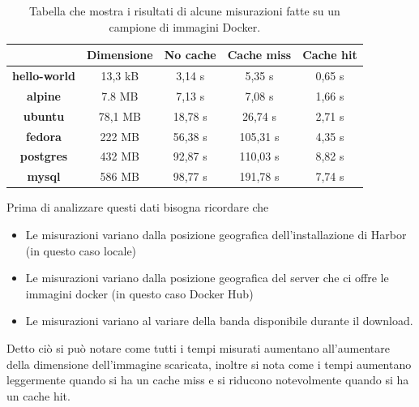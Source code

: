 \documentclass[12pt,a4paper]{report}
\begin{document}
\begin{table}[]
    \begin{tabular}{|c|c|c|c|c|}
    \hline
                         & \textbf{Dimensione} & \textbf{No cache} & \textbf{Cache miss} & \textbf{Cache hit} \\ \hline
    \textbf{hello-world} & 13,3 kB             & 3,14 s            & 5,35 s              & 0,65 s             \\ \hline
    \textbf{alpine}      & 7.8 MB              & 7,13 s            & 7,08 s              & 1,66 s             \\ \hline
    \textbf{ubuntu}      & 78,1 MB             & 18,78 s           & 26,74 s             & 2,71 s             \\ \hline
    \textbf{fedora}      & 222 MB              & 56,38 s           & 105,31 s            & 4,35 s             \\ \hline
    \textbf{postgres}    & 432 MB              & 92,87 s           & 110,03 s            & 8,82 s             \\ \hline
    \textbf{mysql}       & 586 MB              & 98,77 s           & 191,78 s            & 7,74 s             \\ \hline
    \end{tabular}
    \caption{Tabella che mostra i risultati di alcune misurazioni fatte su un campione di immagini Docker.}
    \label{table:benchmark}
\end{table}
Prima di analizzare questi dati bisogna ricordare che
\begin{itemize}
    \item Le misurazioni variano dalla posizione geografica dell'installazione di Harbor (in questo caso locale)
    \item Le misurazioni variano dalla posizione geografica del server che ci offre le immagini docker (in questo caso Docker Hub)
    \item Le misurazioni variano al variare della banda disponibile durante il download.
\end{itemize}
Detto ciò si può notare come tutti i tempi misurati aumentano all'aumentare della dimensione dell'immagine scaricata, inoltre si nota come i tempi aumentano leggermente quando si ha un cache miss e si riducono notevolmente quando si ha un cache hit.
\end{document}
